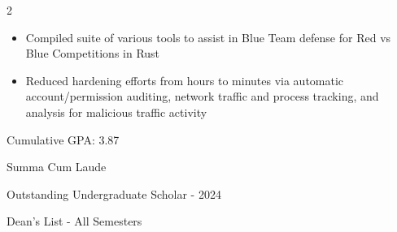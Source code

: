 \documentclass[10pt,a4paper,ragged2e,withhyper]{altacv}
\begin{document}
\begin{paracol}{2}


\divider

\begin{itemize}
\item Compiled suite of various tools to assist in Blue Team defense for Red vs Blue Competitions in Rust
\item Reduced hardening efforts from hours to minutes via automatic account/permission auditing, network traffic and process tracking, and analysis for malicious traffic activity
\end{itemize}

\medskip


\newpage

\switchcolumn


Cumulative GPA: 3.87

Summa Cum Laude

Outstanding Undergraduate Scholar - 2024

Dean's List - All Semesters

\medskip


 \\

\medskip

 \\
 \\
 \\
 \\


\end{paracol}
\end{document}
